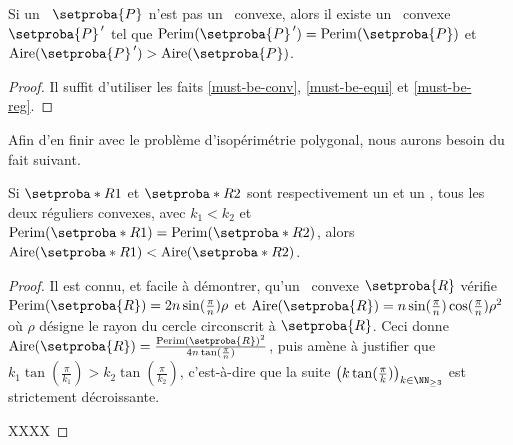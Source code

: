 

\begin{fact} \label{nece-cond}
	Si un \ngone\ $\setproba{P}$ n'est pas un \nreg\ convexe,
	alors il existe un \ngone\ convexe $\primeit{\setproba{P}}$ tel que
	$\perim{\primeit{\setproba{P}}} = \perim{\setproba{P}}$
	et
	$\area{\primeit{\setproba{P}}} > \area{\setproba{P}}$.
\end{fact}


\begin{proof}
	Il suffit d'utiliser les faits \ref{must-be-conv}, \ref{must-be-equi} et \ref{must-be-reg}.
\end{proof}




Afin d'en finir avec le problème d'isopérimétrie polygonal, nous aurons besoin du fait suivant.


\begin{fact} \label{nregs-sorting}
	Si $\setproba*{R}{1}$ et $\setproba*{R}{2}$ sont respectivement un  et un , tous les deux réguliers convexes, avec 
	$k_1 < k_2$ et $\perim{\setproba*{R}{1}} = \perim{\setproba*{R}{2}}$,
	alors
	$\area{\setproba*{R}{1}} < \area{\setproba*{R}{2}}$.
\end{fact}


\begin{proof}
    Il est connu, et facile à démontrer, qu'un \nreg\ convexe $\setproba{R}$ vérifie
    $\perim{\setproba{R}} = 2 n \sin (\frac{\pi}{n}) \rho$
    et
	$\area{\setproba{R}} = n \sin (\frac{\pi}{n})  \cos (\frac{\pi}{n}) \rho^2$
	où $\rho$ désigne le rayon du cercle circonscrit à $\setproba{R}$.
	Ceci donne 
	$\area{\setproba{R}} = \frac{\perim{\setproba{R}}^2}{4 n \tan (\frac{\pi}{n})}$,
	puis amène à justifier que 
	$k_1 \tan (\frac{\pi}{k_1}) > k_2 \tan (\frac{\pi}{k_2})$,
	c'est-à-dire que la suite $\big( k \tan (\frac{\pi}{k}) \big)_{k \in \NN_{\geq 3}}$ est strictement décroissante.
	
	
	XXXX
\end{proof}

